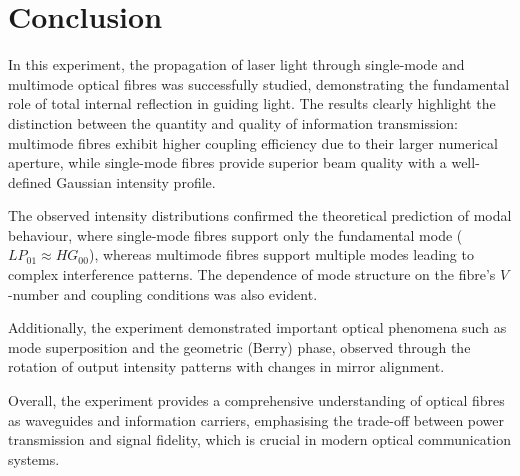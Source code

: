 \section{Conclusion}

In this experiment, the propagation of laser light through single-mode and multimode optical fibres was successfully studied, demonstrating the fundamental role of total internal reflection in guiding light. The results clearly highlight the distinction between the quantity and quality of information transmission: multimode fibres exhibit higher coupling efficiency due to their larger numerical aperture, while single-mode fibres provide superior beam quality with a well-defined Gaussian intensity profile.

The observed intensity distributions confirmed the theoretical prediction of modal behaviour, where single-mode fibres support only the fundamental mode ($LP_{01} \approx HG_{00}$), whereas multimode fibres support multiple modes leading to complex interference patterns. The dependence of mode structure on the fibre’s $V$-number and coupling conditions was also evident.

Additionally, the experiment demonstrated important optical phenomena such as mode superposition and the geometric (Berry) phase, observed through the rotation of output intensity patterns with changes in mirror alignment.

Overall, the experiment provides a comprehensive understanding of optical fibres as waveguides and information carriers, emphasising the trade-off between power transmission and signal fidelity, which is crucial in modern optical communication systems.
